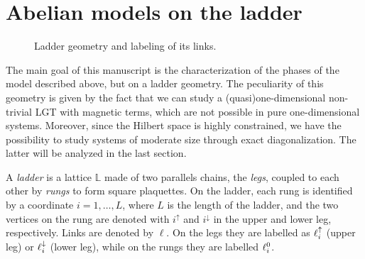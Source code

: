 \section{Abelian models on the ladder}
\label{sec:abelian_models_on_the_ladder}


\begin{figure}
    \centering
    
    \caption{Ladder geometry and labeling of its links.}%
    \label{fig:ladder_geometry}
\end{figure}


The main goal of this manuscript is the characterization of the phases of the model described above, but on a ladder geometry.
The peculiarity of this geometry is given by the fact that we can study a (quasi)one-dimensional non-trivial LGT with magnetic terms, which are not possible in pure one-dimensional systems.
Moreover, since the Hilbert space is highly constrained, we have the possibility to study systems of moderate size through exact diagonalization.
The latter will be analyzed in the last section.

%
A \emph{ladder} is a lattice $\mathbb{L}$ made of two parallels chains, the \emph{legs}, coupled to each other by \emph{rungs} to form square plaquettes.
On the ladder, each rung is identified by a coordinate $i=1,\dots,L$, where $L$ is the length of the ladder, and the two vertices on the rung are denoted with $i^{\uparrow}$ and $i^{\downarrow}$ in the upper and lower leg, respectively.
Links are denoted by $\ell$.
On the legs they are labelled as $\ell^\uparrow_i$ (upper leg) or $\ell^\downarrow_i$ (lower leg), while on the rungs they are labelled $\ell^0_i$.


